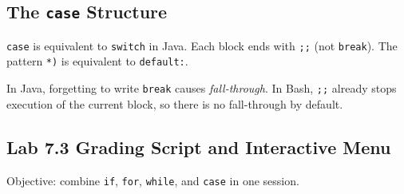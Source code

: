 \subsection*{The \texttt{case} Structure}

\texttt{case} is equivalent to \texttt{switch} in Java. Each block ends with
\texttt{;;} (not \texttt{break}). The pattern \texttt{*)} is equivalent to
\texttt{default:}.

\begin{notebox}
In Java, forgetting to write \texttt{break} causes \textit{fall-through}. In
Bash, \texttt{;;} already stops execution of the current block, so there is no
fall-through by default.
\end{notebox}

\subsection*{Lab 7.3 Grading Script and Interactive Menu}

Objective: combine \texttt{if}, \texttt{for}, \texttt{while}, and
\texttt{case} in one session.

